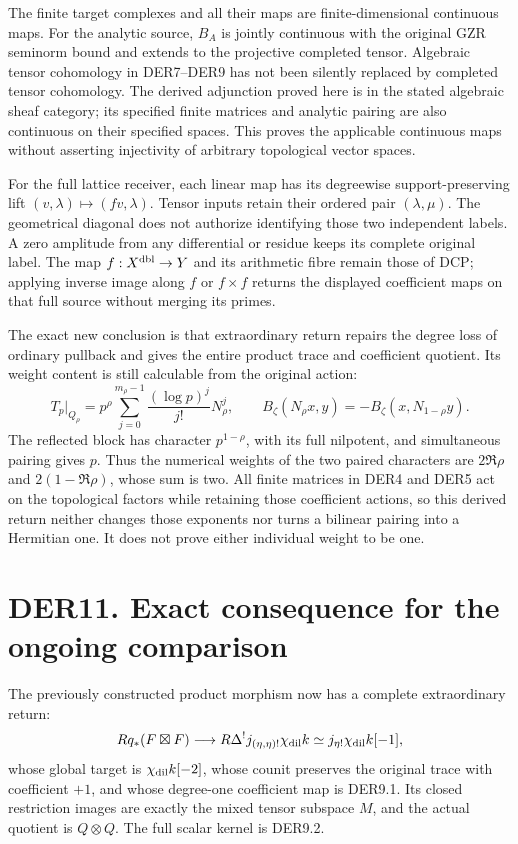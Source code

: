 The finite target complexes and all their maps are finite-dimensional
continuous maps. For the analytic source, \(B_A\) is jointly continuous
with the original GZR seminorm bound and extends to the projective
completed tensor. Algebraic tensor cohomology in DER7--DER9 has not been
silently replaced by completed tensor cohomology. The derived adjunction
proved here is in the stated algebraic sheaf category; its specified
finite matrices and analytic pairing are also continuous on their
specified spaces. This proves the applicable continuous maps without
asserting injectivity of arbitrary topological vector spaces.

For the full lattice receiver, each linear map has its degreewise
support-preserving lift \((v,\lambda)\mapsto(fv,\lambda)\). Tensor
inputs retain their ordered pair \((\lambda,\mu)\). The geometrical
diagonal does not authorize identifying those two independent labels. A
zero amplitude from any differential or residue keeps its complete
original label. The map \(f:X^{\rm dbl}\to Y\) and its arithmetic fibre
remain those of DCP; applying inverse image along \(f\) or \(f\times f\)
returns the displayed coefficient maps on that full source without
merging its primes.

The exact new conclusion is that extraordinary return repairs the degree
loss of ordinary pullback and gives the entire product trace and
coefficient quotient. Its weight content is still calculable from the
original action: \[
T_p|_{Q_\rho}
=p^\rho\sum_{j=0}^{m_\rho-1}\frac{(\log p)^j}{j!}N_\rho^j,\qquad
B_\zeta(N_\rho x,y)=-B_\zeta(x,N_{1-\rho}y).
\] The reflected block has character \(p^{1-\rho}\), with its full
nilpotent, and simultaneous pairing gives \(p\). Thus the numerical
weights of the two paired characters are \(2\Re\rho\) and
\(2(1-\Re\rho)\), whose sum is two. All finite matrices in DER4 and DER5
act on the topological factors while retaining those coefficient
actions, so this derived return neither changes those exponents nor
turns a bilinear pairing into a Hermitian one. It does not prove either
individual weight to be one.

\section{DER11. Exact consequence for the ongoing
comparison}\label{der11.-exact-consequence-for-the-ongoing-comparison}

The previously constructed product morphism now has a complete
extraordinary return: \[
Rq_*(F\boxtimes F)\longrightarrow
R\Delta^!j_{(\eta,\eta)!}\chi_{\rm dil}k
 \simeq j_{\eta!}\chi_{\rm dil}k[-1],
\] whose global target is \(\chi_{\rm dil}k[-2]\), whose counit
preserves the original trace with coefficient \(+1\), and whose
degree-one coefficient map is DER9.1. Its closed restriction images are
exactly the mixed tensor subspace \(M\), and the actual quotient is
\(Q\otimes Q\). The full scalar kernel is DER9.2.

